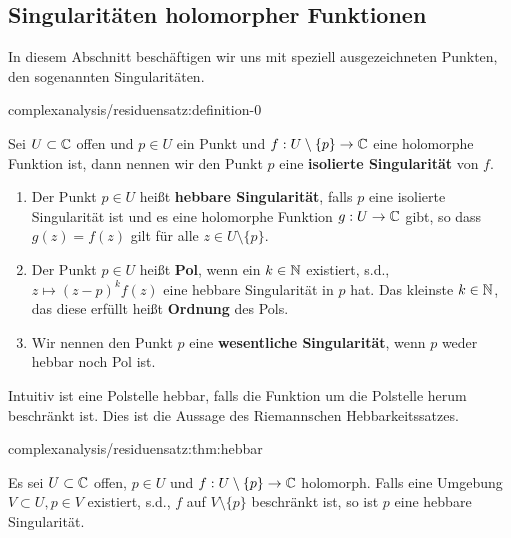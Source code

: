 \subsection{Singularitäten holomorpher Funktionen}
\label{\detokenize{complexanalysis/residuensatz:singularitaten-holomorpher-funktionen}}
\par
In diesem Abschnitt beschäftigen wir uns mit speziell ausgezeichneten Punkten, den sogenannten Singularitäten.
\begin{definition}{}{complexanalysis/residuensatz:definition-0}



\par
Sei \(U \subset \mathbb{C}\) offen und \(p\in U\) ein Punkt und \(f: U \setminus \{p\}\to\mathbb{C}\) eine holomorphe Funktion ist, dann nennen wir den Punkt \(p\) eine \textbf{isolierte Singularität} von \(f\).
\begin{enumerate}

\item {} 
\par
Der Punkt \(p\in U\) heißt \textbf{hebbare Singularität}, falls \(p\) eine isolierte Singularität ist und es eine holomorphe Funktion \(g:U\to\mathbb{C}\) gibt, so dass \(g(z) = f(z)\) gilt für alle \(z \in U \setminus \{p\}\).

\item {} 
\par
Der Punkt \(p\in U\) heißt \textbf{Pol}, wenn ein \(k\in\mathbb{N}\) existiert, s.d., \(z\mapsto (z-p)^k f(z)\) eine hebbare Singularität in \(p\) hat. Das kleinste \(k\in\mathbb{N}\), das diese erfüllt heißt \textbf{Ordnung} des Pols.

\item {} 
\par
Wir nennen den Punkt \(p\) eine \textbf{wesentliche Singularität}, wenn \(p\) weder hebbar noch Pol ist.

\end{enumerate}
\end{definition}

\par
Intuitiv ist eine Polstelle hebbar, falls die Funktion um die Polstelle herum beschränkt ist. Dies ist die Aussage des Riemannschen Hebbarkeitssatzes.
\begin{theorem}{}{complexanalysis/residuensatz:thm:hebbar}



\par
Es sei \(U\subset \mathbb{C}\) offen, \(p\in U\) und \(f:U\setminus\{p\}\to\mathbb{C}\) holomorph. Falls eine Umgebung \(V\subset U, p\in V\) existiert, s.d., \(f\) auf \(V\setminus\{p\}\) beschränkt ist, so ist \(p\) eine hebbare Singularität.
\end{theorem}

